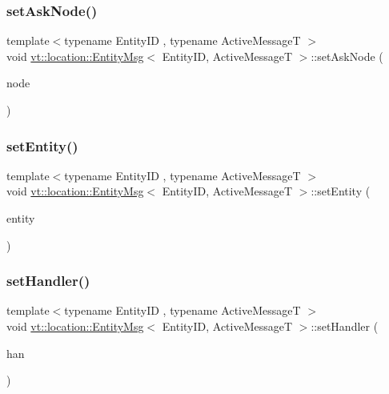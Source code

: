 \subsubsection{\texorpdfstring{set\+Ask\+Node()}{setAskNode()}}
{\footnotesize\ttfamily template$<$typename Entity\+ID , typename Active\+MessageT $>$ \\
void \hyperlink{structvt_1_1location_1_1_entity_msg}{vt\+::location\+::\+Entity\+Msg}$<$ Entity\+ID, Active\+MessageT $>$\+::set\+Ask\+Node (\begin{DoxyParamCaption}\item[{\hyperlink{namespacevt_a866da9d0efc19c0a1ce79e9e492f47e2}{Node\+Type} const \&}]{node }\end{DoxyParamCaption})\hspace{0.3cm}{\ttfamily [inline]}}

\mbox{\label{structvt_1_1location_1_1_entity_msg_a76a6b14309f9a20a0b6cd2afa9a80917}} 
\subsubsection{\texorpdfstring{set\+Entity()}{setEntity()}}
{\footnotesize\ttfamily template$<$typename Entity\+ID , typename Active\+MessageT $>$ \\
void \hyperlink{structvt_1_1location_1_1_entity_msg}{vt\+::location\+::\+Entity\+Msg}$<$ Entity\+ID, Active\+MessageT $>$\+::set\+Entity (\begin{DoxyParamCaption}\item[{Entity\+ID const \&}]{entity }\end{DoxyParamCaption})\hspace{0.3cm}{\ttfamily [inline]}}

\mbox{\label{structvt_1_1location_1_1_entity_msg_af3c49e5e6d894d29984bf9ebf3983717}} 
\subsubsection{\texorpdfstring{set\+Handler()}{setHandler()}}
{\footnotesize\ttfamily template$<$typename Entity\+ID , typename Active\+MessageT $>$ \\
void \hyperlink{structvt_1_1location_1_1_entity_msg}{vt\+::location\+::\+Entity\+Msg}$<$ Entity\+ID, Active\+MessageT $>$\+::set\+Handler (\begin{DoxyParamCaption}\item[{\hyperlink{namespacevt_af64846b57dfcaf104da3ef6967917573}{Handler\+Type} const}]{han }\end{DoxyParamCaption})\hspace{0.3cm}{\ttfamily [inline]}}

